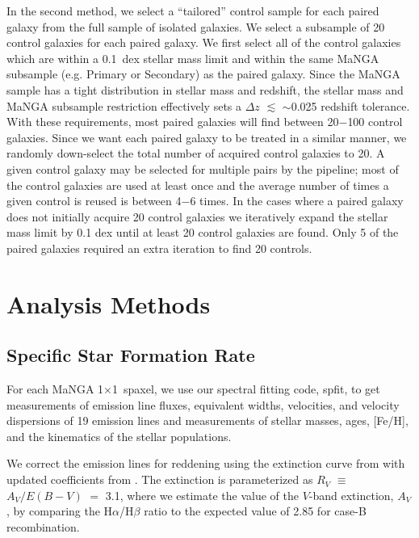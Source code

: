 \documentclass[iop,revtex4,twocolumn,apj,numberedappendix,appendixfloats]{emulateapj}
\begin{document}
In the second method, we select a ``tailored'' control sample for each paired galaxy from the full sample of isolated galaxies. We select a subsample of 20 control galaxies for each paired galaxy. We first select all of the control galaxies which are within a 0.1~dex stellar mass limit and within the same MaNGA subsample (e.g. Primary or Secondary) as the paired galaxy. Since the MaNGA sample has a tight distribution in stellar mass and redshift, the stellar mass and MaNGA subsample restriction effectively sets a $\Delta z$ $\lesssim$ $\sim$0.025 redshift tolerance. With these requirements, most paired galaxies will find between 20$-$100 control galaxies. Since we want each paired galaxy to be treated in a similar manner, we randomly down-select the total number of acquired control galaxies to 20. A given control galaxy may be selected for multiple pairs by the pipeline; most of the control galaxies are used at least once and the average number of times a given control is reused is between 4$-$6 times. In the cases where a paired galaxy does not initially acquire 20 control galaxies we iteratively expand the stellar mass limit by 0.1 dex until at least 20 control galaxies are found. Only 5 of the paired galaxies required an extra iteration to find 20 controls. 

\section{Analysis Methods}\label{sec:analysis}

\subsection{Specific Star Formation Rate}

For each MaNGA 1\arcsec$\times$1\arcsec\ spaxel, we use our spectral fitting code, {\sc spfit}, to get measurements of emission line fluxes, equivalent widths, velocities, and velocity dispersions of 19 emission lines and measurements of stellar masses, ages, [Fe/H], and the kinematics of the stellar populations. 

We correct the emission lines for reddening using the extinction curve from \citet{Cardelli:1989} with updated coefficients from \citet{ODonnell:1994}. The extinction is parameterized as $R_V$ $\equiv$ $A_V/E(B-V)$ $=$ 3.1, where we estimate the value of the $V$-band extinction, $A_V$, by comparing the H$\alpha$/H$\beta$ ratio to the expected value of 2.85 for case-B recombination. 
\end{document}
